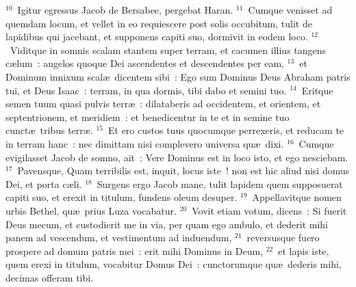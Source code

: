 ${}^{10}$~Igitur egressus Jacob de Bersabee, pergebat Haran.
${}^{11}$~Cumque venisset ad quemdam locum, et vellet in eo requiescere post solis occubitum, tulit de lapidibus qui jacebant, et supponens capiti suo, dormivit in eodem loco.
${}^{12}$~Viditque in somnis scalam stantem super terram, et cacumen illius tangens c\ae lum~: angelos quoque Dei ascendentes et descendentes per eam,
${}^{13}$~et Dominum innixum scal\ae\ dicentem sibi~: Ego sum Dominus Deus Abraham patris tui, et Deus Isaac~: terram, in qua dormis, tibi dabo et semini tuo.
${}^{14}$~Eritque semen tuum quasi pulvis terr\ae~: dilataberis ad occidentem, et orientem, et septentrionem, et meridiem~: et benedicentur in te et in semine tuo cunct\ae\ tribus terr\ae .
${}^{15}$~Et ero custos tuus quocumque perrexeris, et reducam te in terram hanc~: nec dimittam nisi complevero universa qu\ae\ dixi.
${}^{16}$~Cumque evigilasset Jacob de somno, ait~: Vere Dominus est in loco isto, et ego nesciebam.
${}^{17}$~Pavensque, Quam terribilis est, inquit, locus iste~! non est hic aliud nisi domus Dei, et porta c\ae li.
${}^{18}$~Surgens ergo Jacob mane, tulit lapidem quem supposuerat capiti suo, et erexit in titulum, fundens oleum desuper.
${}^{19}$~Appellavitque nomen urbis Bethel, qu\ae\ prius Luza vocabatur.
${}^{20}$~Vovit etiam votum, dicens~: Si fuerit Deus mecum, et custodierit me in via, per quam ego ambulo, et dederit mihi panem ad vescendum, et vestimentum ad induendum,
${}^{21}$~reversusque fuero prospere ad domum patris mei~: erit mihi Dominus in Deum,
${}^{22}$~et lapis iste, quem erexi in titulum, vocabitur Domus Dei~: cunctorumque qu\ae\ dederis mihi, decimas offeram tibi.


